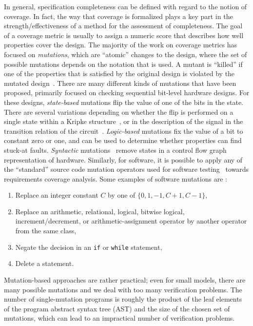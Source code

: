 In general, specification completeness can be defined with
regard to the notion of coverage. In fact, the way that coverage
is formalized plays a key part in the strength/effectiveness of
a method for the assessment of completeness. The goal of a coverage metric is usually to assign a numeric score that describes how well properties cover the design. The majority of the work on coverage metrics has focused on {\em mutations}, which are ``atomic'' changes to the design, where the set of possible mutations depends on the notation that is used.  A mutant is ``killed'' if one of the properties that is satisfied by the original design is violated by the mutated design~\cite{chockler_coverage_2003,chockler2001practical,chockler2010coverage,Kupferman:2006:SCF,kupferman_theory_2008}.  There are many different kinds of mutations that have been proposed, primarily focused on checking sequential bit-level hardware designs.  For these designs, {\em state-based} mutations flip the value of one of the bits in the state.  There are several variations depending on whether the flip is performed on a single state within a Kripke structure~\cite{hoskote1999coverage}, or in the description of the signal in the transition relation of the circuit~\cite{chockler2001practical}.  {\em Logic-based} mutations fix the value of a bit to constant zero or one, and can be used to determine whether properties can find stuck-at faults.  {\em Syntactic} mutations~\cite{chockler_coverage_2003} remove states in a control flow graph representation of hardware.  Similarly, for software, it is possible to apply any of the ``standard'' source code mutation operators used for software testing~\cite{Andrews06:mutation} towards requirements coverage analysis.  Some examples of software mutations are \cite{Budd:1980}:
\begin{enumerate}
    \item Replace an integer constant $C$ by one of $\{0, 1, -1, C + 1, C - 1\}$,
    \item Replace an arithmetic, relational, logical, bitwise logical, increment/decrement, or arithmetic-assignment operator by another operator from the same class,
    \item Negate the decision in an \texttt{if} or \texttt{while} statement,
    \item Delete a statement.
\end{enumerate}

Mutation-based approaches are rather practical; even for small models, there are many possible mutations and we deal with too many verification problems.  The number of single-mutation programs is roughly the product of the leaf elements of the program abstract syntax tree (AST) and the size of the chosen set of mutations, which can lead to an impractical number of verification problems.

